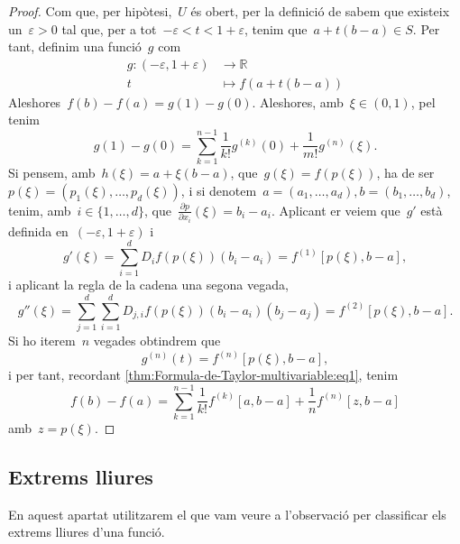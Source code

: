 \documentclass[../../main.tex]{subfiles}
\begin{document}
    \begin{proof}
        Com que, per hipòtesi,~\(U\) és obert, per la definició de  sabem que existeix un~\(\varepsilon>0\) tal que, per a tot~\(-\varepsilon<t<1+\varepsilon\), tenim que~\(a+t(b-a)\in S\).
        Per tant, definim una funció~\(g\) com
        \begin{align*}
        g\colon(-\varepsilon,1+\varepsilon)&\to\mathbb{R}\\
        t&\mapsto f(a+t(b-a))
        \end{align*}
        Aleshores~\(f(b)-f(a)=g(1)-g(0)\).
        Aleshores, amb~\(\xi\in(0,1)\), pel  tenim
        \begin{equation}\label{thm:Formula-de-Taylor-multivariable:eq1}
        g(1)-g(0)=\sum_{k=1}^{n-1}\frac{1}{k!}g^{(k)}(0)+\frac{1}{m!}g^{(n)}(\xi).
        \end{equation}
        Si pensem, amb~\(h(\xi)=a+\xi(b-a)\), que~\(g(\xi)=f(p(\xi))\), ha de ser~\(p(\xi)=(p_{1}(\xi),\dots,p_{d}(\xi))\), i si denotem~\(a=(a_{1},\dots,a_{d}),b=(b_{1},\dots,b_{d})\), tenim, amb~\(i\in\{1,\dots,d\}\), que~\(\frac{\partial p}{\partial x_{i}}(\xi)=b_{i}-a_{i}\).
        Aplicant er  veiem que~\(g'\) està definida en~\((-\varepsilon,1+\varepsilon)\) i
        \[
            g'(\xi)=\sum_{i=1}^{d}D_{i}f(p(\xi))(b_{i}-a_{i})=f^{(1)}[p(\xi),b-a],
        \]
        i aplicant la regla de la cadena una segona vegada,
        \[
            g''(\xi)=\sum_{j=1}^{d}\sum_{i=1}^{d}D_{j,i}f(p(\xi))(b_{i}-a_{i})(b_{j}-a_{j})=f^{(2)}[p(\xi),b-a].
        \]
        Si ho iterem~\(n\) vegades obtindrem que
        \[
            g^{(n)}(t)=f^{(n)}[p(\xi),b-a],
        \]
        i per tant, recordant \eqref{thm:Formula-de-Taylor-multivariable:eq1}, tenim
        \[
            f(b)-f(a)=\sum_{k=1}^{n-1}\frac{1}{k!}f^{(k)}[a,b-a]+\frac{1}{n}f^{(n)}[z,b-a]
        \]
        amb~\(z=p(\xi)\).
    \end{proof}
    \subsection{Extrems lliures}\label{sec:Classificar-extrems-lliures}
    En aquest apartat utilitzarem el que vam veure a l'observació  per classificar els extrems lliures d'una funció.
\end{document}
